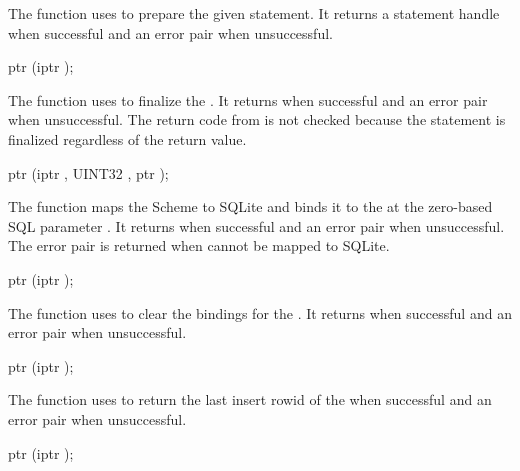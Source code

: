 The  function uses
 to prepare the given 
statement. It returns a statement handle when successful and an error
pair when unsuccessful.

\begin{function}
  ptr (iptr );
\end{function}\antipar

The  function uses
 to finalize the .  It
returns  when successful and an error pair when
unsuccessful. The return code from  is not
checked because the statement is finalized regardless of the return
value.

\begin{function}
  ptr (iptr , UINT32 , ptr );
\end{function}\antipar

The  function maps the Scheme 
to SQLite and binds it to the  at the zero-based SQL
parameter .  It returns  when successful and an
error pair when unsuccessful. The error pair
 is
returned when  cannot be mapped to SQLite.

\begin{function}
  ptr (iptr );
\end{function}\antipar

The  function uses
 to clear the bindings for the
. It returns  when successful and an error
pair when unsuccessful.

\begin{function}
  ptr (iptr );
\end{function}\antipar

The  function uses
 to return the last insert rowid
of the  when successful and an error pair when
unsuccessful.

\begin{function}
  ptr (iptr );
\end{function}\antipar

